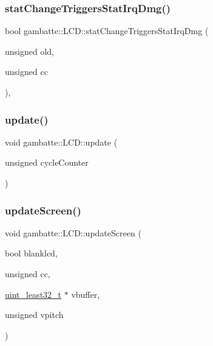 \mbox{\label{classgambatte_1_1LCD_affafcdc54fc073a21b20a04eab7c3531}} 
\subsubsection{\texorpdfstring{stat\+Change\+Triggers\+Stat\+Irq\+Dmg()}{statChangeTriggersStatIrqDmg()}}
{\footnotesize\ttfamily bool gambatte\+::\+L\+C\+D\+::stat\+Change\+Triggers\+Stat\+Irq\+Dmg (\begin{DoxyParamCaption}\item[{unsigned}]{old,  }\item[{unsigned}]{cc }\end{DoxyParamCaption})\hspace{0.3cm}{\ttfamily [inline]}, {\ttfamily [private]}}

\mbox{\label{classgambatte_1_1LCD_a457f2dd7c97b98c35fc196a1a4259d7c}} 
\subsubsection{\texorpdfstring{update()}{update()}}
{\footnotesize\ttfamily void gambatte\+::\+L\+C\+D\+::update (\begin{DoxyParamCaption}\item[{unsigned}]{cycle\+Counter }\end{DoxyParamCaption})}

\mbox{\label{classgambatte_1_1LCD_a6a057feecd6cf79fd09ce19ae91e11df}} 
\subsubsection{\texorpdfstring{update\+Screen()}{updateScreen()}}
{\footnotesize\ttfamily void gambatte\+::\+L\+C\+D\+::update\+Screen (\begin{DoxyParamCaption}\item[{bool}]{blanklcd,  }\item[{unsigned}]{cc,  }\item[{\hyperlink{namespacegambatte_a0639f09fccfbbd5a8e0796318768e370}{uint\+\_\+least32\+\_\+t} $\ast$}]{vbuffer,  }\item[{unsigned}]{vpitch }\end{DoxyParamCaption})}

